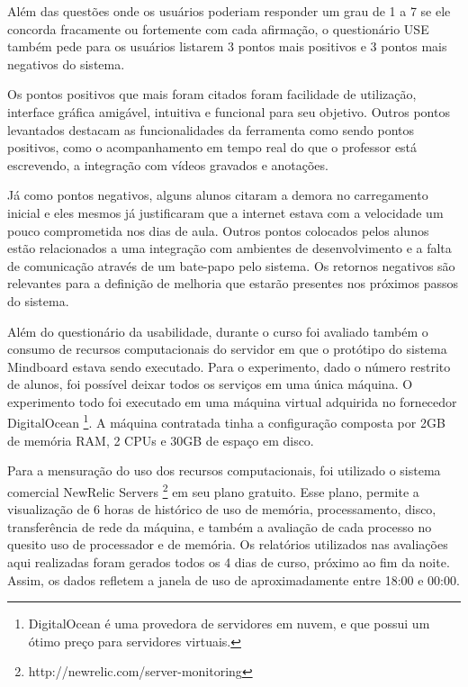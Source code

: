 Além das questões onde os usuários poderiam responder um grau de 1 a 7 se ele concorda fracamente ou fortemente com cada afirmação, o questionário USE também pede para os usuários listarem 3 pontos mais positivos e 3 pontos mais negativos do sistema.

Os pontos positivos que mais foram citados foram facilidade de utilização, interface gráfica amigável, intuitiva e funcional para seu objetivo. Outros pontos levantados destacam as funcionalidades da ferramenta como sendo pontos positivos, como o acompanhamento em tempo real do que o professor está escrevendo, a integração com vídeos gravados e anotações. 


Já como pontos negativos, alguns alunos citaram a demora no carregamento inicial e eles mesmos já justificaram que a internet estava com a velocidade um pouco comprometida nos dias de aula. Outros pontos colocados pelos alunos estão relacionados a uma integração com ambientes de desenvolvimento e a falta de comunicação através de um bate-papo pelo sistema. Os retornos negativos são relevantes para a definição de melhoria que estarão presentes nos próximos passos do sistema.

Além do questionário da usabilidade, durante o curso foi avaliado também o consumo de recursos computacionais do servidor em que o protótipo do sistema Mindboard estava sendo executado. Para o experimento, dado o número restrito de alunos, foi possível deixar todos os serviços em uma única máquina. O experimento todo foi executado em uma máquina virtual adquirida no fornecedor DigitalOcean \footnote{DigitalOcean é uma provedora de servidores em nuvem, e que possui um ótimo preço para servidores virtuais.}. A máquina contratada tinha a configuração composta por 2GB de memória RAM, 2 CPUs e 30GB de espaço em disco.

Para a mensuração do uso dos recursos computacionais, foi utilizado o sistema comercial NewRelic Servers \footnote{http://newrelic.com/server-monitoring} em seu plano gratuito. Esse plano, permite a visualização de 6 horas de histórico de uso de memória, processamento, disco, transferência de rede da máquina, e também a avaliação de cada processo no quesito uso de processador e de memória. Os relatórios utilizados nas avaliações aqui realizadas foram gerados todos os 4 dias de curso, próximo ao fim da noite. Assim, os dados refletem a janela de uso de aproximadamente entre 18:00 e 00:00.

